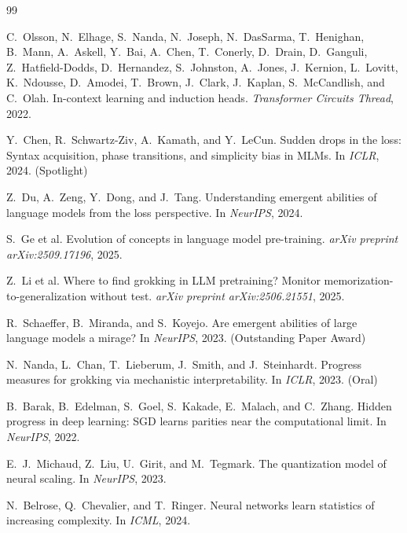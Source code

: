 \documentclass{article}
\theoremstyle{definition}
\begin{document}
\begin{thebibliography}{99}

C.~Olsson, N.~Elhage, S.~Nanda, N.~Joseph, N.~DasSarma, T.~Henighan, B.~Mann, A.~Askell, Y.~Bai, A.~Chen, T.~Conerly, D.~Drain, D.~Ganguli, Z.~Hatfield-Dodds, D.~Hernandez, S.~Johnston, A.~Jones, J.~Kernion, L.~Lovitt, K.~Ndousse, D.~Amodei, T.~Brown, J.~Clark, J.~Kaplan, S.~McCandlish, and C.~Olah.
\newblock In-context learning and induction heads.
\newblock \emph{Transformer Circuits Thread}, 2022.

Y.~Chen, R.~Schwartz-Ziv, A.~Kamath, and Y.~LeCun.
\newblock Sudden drops in the loss: Syntax acquisition, phase transitions, and simplicity bias in {MLMs}.
\newblock In \emph{ICLR}, 2024. (Spotlight)

Z.~Du, A.~Zeng, Y.~Dong, and J.~Tang.
\newblock Understanding emergent abilities of language models from the loss perspective.
\newblock In \emph{NeurIPS}, 2024.

S.~Ge et al.
\newblock Evolution of concepts in language model pre-training.
\newblock \emph{arXiv preprint arXiv:2509.17196}, 2025.

Z.~Li et al.
\newblock Where to find grokking in {LLM} pretraining? {Monitor} memorization-to-generalization without test.
\newblock \emph{arXiv preprint arXiv:2506.21551}, 2025.

R.~Schaeffer, B.~Miranda, and S.~Koyejo.
\newblock Are emergent abilities of large language models a mirage?
\newblock In \emph{NeurIPS}, 2023. (Outstanding Paper Award)

N.~Nanda, L.~Chan, T.~Lieberum, J.~Smith, and J.~Steinhardt.
\newblock Progress measures for grokking via mechanistic interpretability.
\newblock In \emph{ICLR}, 2023. (Oral)

B.~Barak, B.~Edelman, S.~Goel, S.~Kakade, E.~Malach, and C.~Zhang.
\newblock Hidden progress in deep learning: {SGD} learns parities near the computational limit.
\newblock In \emph{NeurIPS}, 2022.

E.~J.~Michaud, Z.~Liu, U.~Girit, and M.~Tegmark.
\newblock The quantization model of neural scaling.
\newblock In \emph{NeurIPS}, 2023.

N.~Belrose, Q.~Chevalier, and T.~Ringer.
\newblock Neural networks learn statistics of increasing complexity.
\newblock In \emph{ICML}, 2024.


\end{thebibliography}
\end{document}
